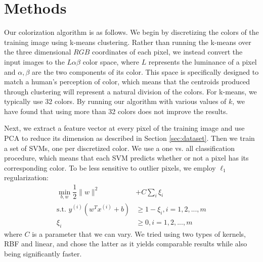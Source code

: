\section{Methods}
\label{sec:methods}

Our colorization algorithm is as follows.  We begin by discretizing the colors of the training image using k-means clustering.  Rather than running the k-means over the three dimensional $RGB$ coordinates of each pixel, we instead convert the input images to the $L\alpha\beta$ color space, where $L$ represents the luminance of a pixel and $\alpha, \beta$ are the two components of its color.  This space is specifically designed to match a human's perception of color, which means that the centroids produced through clustering will represent a natural division of the colors. For k-means, we typically use 32 colors. By running our algorithm with various values of $k$, we have found that using more than 32 colors does not improve the results. 

Next, we extract a feature vector at every pixel of the training image and use PCA to reduce its dimension as described in Section \ref{sec:dataset}. Then we train a set of SVMs, one per discretized color. We use a one vs. all classification procedure, which means that each SVM predicts whether or not a pixel has its corresponding color. To be less sensitive to outlier pixels, we employ $\ell_1$ regularization:
\begin{align}
    \label{eq:SVM}
    \min_{b, w} \dfrac{1}{2} \|w\|^2 &+ C \sum_{i} \xi_i \\
    \text{s.t. } y^{(i)}(w^Tx^{(i)}+b) &\geq 1-\xi_i, i = 1, 2, ..., m \\
    \xi_i &\geq 0, i = 1, 2, ..., m
\end{align}
where $C$ is a parameter that we can vary. We tried using two types of kernels, RBF and linear, and chose the latter as it yields comparable results while also being significantly faster.

